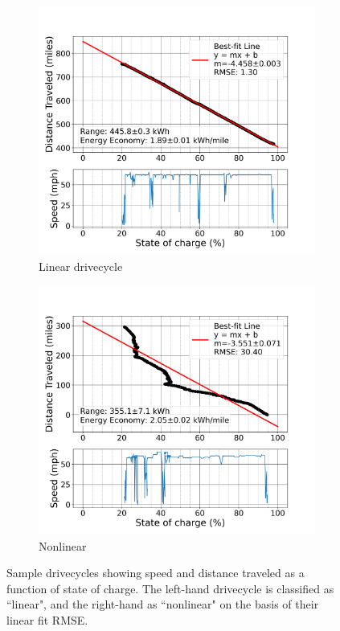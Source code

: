 \begin{figure}[ht]
    \centering
    \begin{subfigure}[b]{0.48\textwidth}
        \centering
        \includegraphics[width=\textwidth]{figures/distance_vs_soc_linear.png}
        \caption{Linear drivecycle}
        \label{fig:distance_vs_soc_linear}
    \end{subfigure}
    \hfill
    \begin{subfigure}[b]{0.48\textwidth}
        \centering
        \includegraphics[width=\textwidth]{figures/distance_vs_soc_nonlinear.png}
        \caption{Nonlinear}
        \label{fig:distance_vs_soc_nonlinear}
    \end{subfigure}
    \caption{Sample drivecycles showing speed and distance traveled as a function of state of charge. The left-hand drivecycle is classified as ``linear", and the right-hand as ``nonlinear" on the basis of their linear fit RMSE.}
    \label{fig:distance_vs_soc}
\end{figure}

